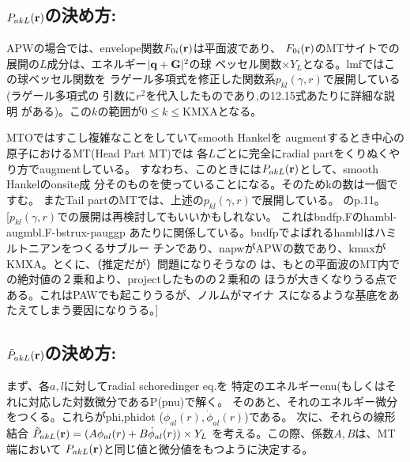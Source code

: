 \documentclass[twocolumn,showpacs,preprintnumbers,amsmath,amssymb,floatfix]{revtex4-1}
\newcommand{\bfq}{{\bf q}}
\newcommand{\bfr}{{\bf r}}
\newcommand{\bfG}{{\bf G}}
\newcommand{\bfR}{{\bf R}}
\def\smh{smHankel}
\begin{document}


\subsection{\bf ${P}_{akL}(\bfr)$の決め方:}
APWの場合\cite{soler89}では、envelope関数$F_{0i}(\bfr)$は平面波であり、
$F_{0i}(\bfr)$のMTサイトでの展開の$L$成分は、エネルギー$|\bfq+\bfG|^2$の球
ベッセル関数$\times Y_L$となる。lmfではこの球ベッセル関数を
ラゲール多項式を修正した関数系$p_{kl}(\gamma,r)$で展開している(ラゲール多項式の
引数に$r^2$を代入したものであり,\cite{Bott98}の12.15式あたりに詳細な説明
がある)。この$k$の範囲が$0\le k \le$KMXAとなる。

MTOではすこし複雑なことをしていてsmooth Hankelを
augmentするとき中心の原子におけるMT(Head Part MT)では
各$L$ごとに完全にradial partをくりぬくやり方でaugmentしている。
すなわち、このときには${P}_{akL}(\bfr)$として、smooth Hankelのonsite成
分そのものを使っていることになる。そのためkの数は一個ですむ。
またTail partのMTでは、上述の$p_{kl}(\gamma,r)$で展開している。
\cite{lmfchap}のp.11。\\


[$p_{kl}(\gamma,r)$での展開は再検討してもいいかもしれない。
これはbndfp.Fのhambl-augmbl.F-bstrux-pauggp
あたりに関係している。bndfpでよばれるhamblはハミルトニアンをつくるサブルー
チンであり、napwがAPWの数であり、kmaxがKMXA。とくに、（推定だが）問題になりそうなの
は、もとの平面波のMT内での絶対値の２乗和より、projectしたものの２乗和の
ほうが大きくなりうる点である。これはPAWでも起こりうるが、ノルムがマイナ
スになるような基底をあたえてしまう要因になりうる。]


\subsection{\bf $\tilde{P}_{akL} (\bfr)$の決め方:}
まず、各$a,l$に対してradial schoredinger eq.を
特定のエネルギーenu(もしくはそれに対応した対数微分であるP(pnu)で解く。
そのあと、それのエネルギー微分をつくる。これらがphi,phidot
($\phi_{al}(r),\dot{\phi}_{al}(r)$)である。
次に、それらの線形結合
$\tilde{P}_{akL}(\bfr)=(A\phi_{al}(r)+ B \dot{\phi}_{al}(r))\times Y_L$
を考える。この際、係数$A,B$は、MT端において
${P}_{akL}(\bfr)$と同じ値と微分値をもつように決定する。
\end{document}
